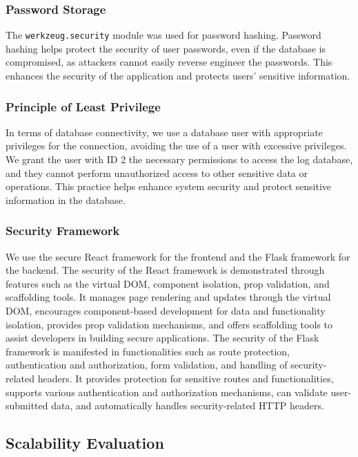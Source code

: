 \documentclass[journal]{IEEEtran}
\begin{document}
\subsubsection{Password Storage}
The \verb|werkzeug.security| module was used for password hashing. Password hashing helps protect the security of user passwords, even if the database is compromised, as attackers cannot easily reverse engineer the passwords. This enhances the security of the application and protects users' sensitive information.

\subsubsection{Principle of Least Privilege}
In terms of database connectivity, we use a database user with appropriate privileges for the connection, avoiding the use of a user with excessive privileges. We grant the user with ID 2 the necessary permissions to access the log database, and they cannot perform unauthorized access to other sensitive data or operations. This practice helps enhance system security and protect sensitive information in the database.

\subsubsection{Security Framework}
We use the secure React framework for the frontend and the Flask framework for the backend. The security of the React framework is demonstrated through features such as the virtual DOM, component isolation, prop validation, and scaffolding tools. It manages page rendering and updates through the virtual DOM, encourages component-based development for data and functionality isolation, provides prop validation mechanisms, and offers scaffolding tools to assist developers in building secure applications.
The security of the Flask framework is manifested in functionalities such as route protection, authentication and authorization, form validation, and handling of security-related headers. It provides protection for sensitive routes and functionalities, supports various authentication and authorization mechanisms, can validate user-submitted data, and automatically handles security-related HTTP headers.

\subsection{Scalability Evaluation}
\label{evaluate:Scalability}
\end{document}
